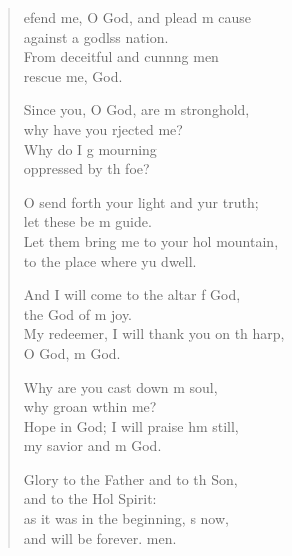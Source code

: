 \settowidth{\versewidth}{My redeemer, I will thank you on the harp, *}
\begin{verse}%
  \begin{patverse}
    efend me, O God, and plead m cause\Med\\
against a godlss nation.\\
From deceitful and cunn\pointup{\i}ng men\Med\\
rescue me,  God.

Since you, O God, are m stronghold,\Med\\
why have you rjected me?\\
Why do I g mourning\Med\\
oppressed by th foe?

O send forth your light and yur truth;\Med\\
let these be m guide.\\
Let them bring me to your hol mountain,\Med\\
to the place where yu dwell.

And I will come to the altar f God,\Med\\
the God of m joy.\\
My redeemer, I will thank you on th harp,\Med\\
O God, m God.

Why are you cast down m soul,\Med\\
why groan w\pointup{\i}thin me?\\
Hope in God; I will praise h\pointup{\i}m still,\Med\\
my savior and m God.

Glory to the Father and to th Son,\Med\\
and to the Hol Spirit:\\
as it was in the beginning, \pointup{\i}s now,\Med\\
and will be forever. men.
  \end{patverse}
\end{verse}
